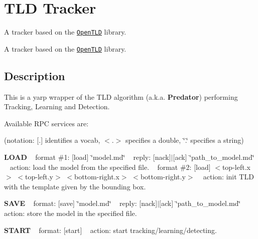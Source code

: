 \section{T\+L\+D Tracker}
\label{group__icub__tld}


A tracker based on the \href{http://gnebehay.github.io/OpenTLD/}{\tt Open\+T\+L\+D} library.  


A tracker based on the \href{http://gnebehay.github.io/OpenTLD/}{\tt Open\+T\+L\+D} library. 

\hypertarget{group__icub__tld_intro_sec}{}\subsection{Description}\label{group__icub__tld_intro_sec}
This is a yarp wrapper of the T\+L\+D algorithm (a.\+k.\+a. {\bfseries Predator}) performing Tracking, Learning and Detection.

Available R\+P\+C services are\+:

(notation\+: \mbox{[}.\mbox{]} identifies a vocab, $<$.$>$ specifies a double, \char`\"{}.\char`\"{} specifies a string)

{\bfseries L\+O\+A\+D} ~\newline
format \#1\+: \mbox{[}load\mbox{]} \char`\"{}model.\+md\char`\"{} ~\newline
 reply\+: \mbox{[}nack\mbox{]}$\vert$\mbox{[}ack\mbox{]} \char`\"{}path\+\_\+to\+\_\+model.\+md\char`\"{} ~\newline
action\+: load the model from the specified file. ~\newline
format \#2\+: \mbox{[}load\mbox{]} $<$top-\/left.\+x$>$ $<$top-\/left.\+y$>$ $<$bottom-\/right.\+x$>$ $<$bottom-\/right.\+y$>$ ~\newline
 action\+: init T\+L\+D with the template given by the bounding box.

{\bfseries S\+A\+V\+E} ~\newline
format\+: \mbox{[}save\mbox{]} \char`\"{}model.\+md\char`\"{} ~\newline
reply\+: \mbox{[}nack\mbox{]}$\vert$\mbox{[}ack\mbox{]} \char`\"{}path\+\_\+to\+\_\+model.\+md\char`\"{} ~\newline
 action\+: store the model in the specified file.

{\bfseries S\+T\+A\+R\+T} ~\newline
format\+: \mbox{[}start\mbox{]} ~\newline
 action\+: start tracking/learning/detecting.

